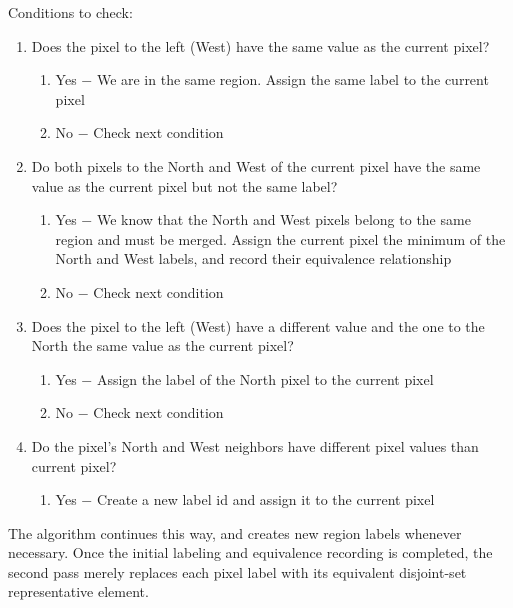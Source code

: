 \documentclass{article}
\begin{document}
	Conditions to check:
	\begin{enumerate}

		\item Does the pixel to the left (West) have the same value as the current pixel?
		\begin{enumerate}
			\item Yes $-$ We are in the same region. Assign the same label to the current pixel
			\item No $-$ Check next condition
		\end{enumerate}
		
		\item Do both pixels to the North and West of the current pixel have the same value as the current pixel but not the same label?
		\begin{enumerate}
			\item Yes $-$ We know that the North and West pixels belong to the same region and must be merged. Assign the current pixel the minimum of the North and West labels, and record their equivalence relationship
			\item No $-$ Check next condition
		\end{enumerate}

		\item Does the pixel to the left (West) have a different value and the one to the North the same value as the current pixel?
		\begin{enumerate}
			\item Yes $-$ Assign the label of the North pixel to the current pixel
			\item No $-$ Check next condition
		\end{enumerate}

		\item Do the pixel's North and West neighbors have different pixel values than current pixel?
		\begin{enumerate}
			\item Yes $-$ Create a new label id and assign it to the current pixel
		\end{enumerate}

	\end{enumerate}
	The algorithm continues this way, and creates new region labels whenever necessary. Once the initial labeling and equivalence recording is completed, the second pass merely replaces each pixel label with its equivalent disjoint-set representative element.
\end{document}

